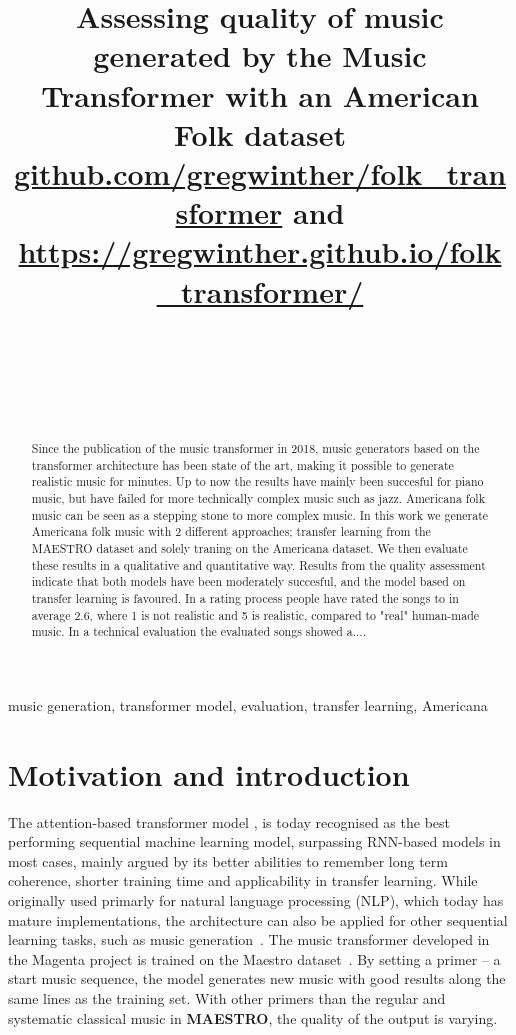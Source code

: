 \documentclass{IEEEtran}
\title{Assessing quality of music generated by the Music Transformer with an
American Folk dataset \\
\normalsize{\url{github.com/gregwinther/folk_transformer} and
\url{https://gregwinther.github.io/folk_transformer/}}}
\author{
    \IEEEauthorblockN{Sebastian G. Winther-Larsen} \\
    \IEEEauthorblockA{\textit{Center for Computing in Science Education,
        Department of Physics, University of Oslo} \\
    }
    \and
    \IEEEauthorblockN{Tom F.Hansen} \\
    \IEEEauthorblockA{\textit{Institute of Informatics, University of Oslo} \\ }
    \and
    \IEEEauthorblockN{Bjørn Iversen} \\
    \IEEEauthorblockA{\textit{Institute of Informatics, University of Oslo} \\ }
}
\begin{document}
\maketitle

\begin{abstract}
    Since the publication of the music transformer in 2018,
    music generators based on the transformer architecture has been state of the
    art, making it possible to generate realistic music for minutes. Up to now
    the results have mainly been succesful for piano music, but have failed for
    more technically complex music such as jazz. Americana folk music can be seen
    as a stepping stone to more complex music. In this work we generate Americana
    folk music with 2 different approaches; transfer learning from the MAESTRO
    dataset and solely traning on the Americana dataset. We then evaluate these
    results in a qualitative and quantitative way. Results from the quality
    assessment indicate that both models have been moderately succesful, and the
    model based on transfer learning is favoured. In a rating process people have
    rated the songs to in average 2.6, where 1 is not realistic and 5 is
    realistic, compared to "real" human-made music. In a technical evaluation the
    evaluated songs showed a....
\end{abstract}

\begin{IEEEkeywords}
    music generation, transformer model, evaluation,
    transfer learning, Americana
\end{IEEEkeywords}

\section{Motivation and introduction}

The attention-based transformer model \cite{vaswani2017attention}, is today
recognised as the best performing sequential machine learning model,
surpassing RNN-based models in most cases, mainly argued by its better
abilities to remember long term coherence, shorter training time and
applicability in transfer learning. While originally used primarly for
natural language processing (NLP), which today has mature implementations,
the architecture can also be applied for other sequential learning tasks,
such as music generation~\cite{huang2018music}. The music transformer
developed in the Magenta project is trained on the Maestro
dataset~\cite{maestrodataset}. By setting a primer – a start music sequence,
the model generates new music with good results along the same lines as the
training set. With other primers than the regular and systematic classical
music in \textbf{MAESTRO}, the quality of the output is varying.
\end{document}
